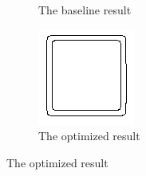 \documentclass[10pt,final,journal]{IEEEtran}
\begin{document}
\begin{figure}[h!]
\begin{subfigure}[b]{0.3\textwidth}
            \caption{The baseline result}
            \label{fig:app_square_baseline}
    \end{subfigure}
    \begin{subfigure}[b]{0.3\textwidth}
            \includegraphics[width=\textwidth]{square_out}
            \caption{The optimized result}
            \label{fig:app_square_out}
    \end{subfigure}
   

\end{figure}
\end{document}

